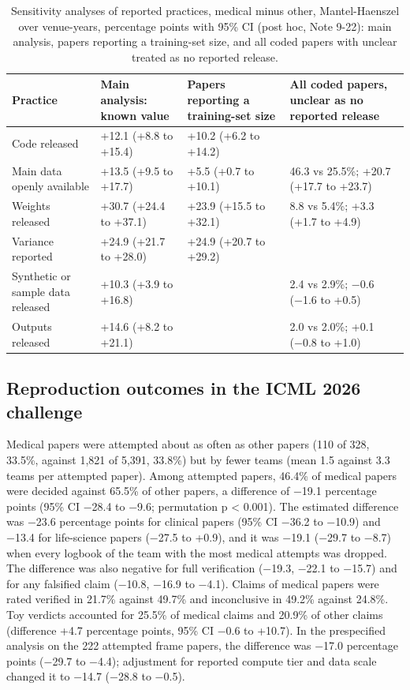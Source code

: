 \documentclass[11pt]{article}
\begin{document}
\begin{table}[htbp]
\centering\footnotesize
\renewcommand{\thetable}{4}
\caption{Sensitivity analyses of reported practices, medical minus other, Mantel-Haenszel over venue-years, percentage points with 95\% CI (post hoc, Note 9-22): main analysis, papers reporting a training-set size, and all coded papers with unclear treated as no reported release.}\label{tab:table4}
\begin{tabularx}{\textwidth}{XL{3.55cm}L{3.55cm}L{3.9cm}}
\toprule
\textbf{Practice} & \textbf{Main analysis: known value} & \textbf{Papers reporting a training-set size} & \textbf{All coded papers, unclear as no reported release} \\ \midrule
Code released & +12.1 (+8.8 to +15.4) & +10.2 (+6.2 to +14.2) &  \\
Main data openly available & +13.5 (+9.5 to +17.7) & +5.5 (+0.7 to +10.1) & 46.3 vs 25.5\%; +20.7 (+17.7 to +23.7) \\
Weights released & +30.7 (+24.4 to +37.1) & +23.9 (+15.5 to +32.1) & 8.8 vs 5.4\%; +3.3 (+1.7 to +4.9) \\
Variance reported & +24.9 (+21.7 to +28.0) & +24.9 (+20.7 to +29.2) &  \\
Synthetic or sample data released & +10.3 (+3.9 to +16.8) &  & 2.4 vs 2.9\%; −0.6 (−1.6 to +0.5) \\
Outputs released & +14.6 (+8.2 to +21.1) &  & 2.0 vs 2.0\%; +0.1 (−0.8 to +1.0) \\
\bottomrule
\end{tabularx}
\end{table}

\subsection*{Reproduction outcomes in the ICML 2026 challenge}
Medical papers were attempted about as often as other papers (110 of 328, 33.5\%, against 1,821 of 5,391, 33.8\%) but by fewer teams (mean 1.5 against 3.3 teams per attempted paper). Among attempted papers, 46.4\% of medical papers were decided against 65.5\% of other papers, a difference of −19.1 percentage points (95\% CI −28.4 to −9.6; permutation p < 0.001). The estimated difference was −23.6 percentage points for clinical papers (95\% CI −36.2 to −10.9) and −13.4 for life-science papers (−27.5 to +0.9), and it was −19.1 (−29.7 to −8.7) when every logbook of the team with the most medical attempts was dropped. The difference was also negative for full verification (−19.3, −22.1 to −15.7) and for any falsified claim (−10.8, −16.9 to −4.1). Claims of medical papers were rated verified in 21.7\% against 49.7\% and inconclusive in 49.2\% against 24.8\%. Toy verdicts accounted for 25.5\% of medical claims and 20.9\% of other claims (difference +4.7 percentage points, 95\% CI −0.6 to +10.7). In the prespecified analysis on the 222 attempted frame papers, the difference was −17.0 percentage points (−29.7 to −4.4); adjustment for reported compute tier and data scale changed it to −14.7 (−28.8 to −0.5).
\end{document}
